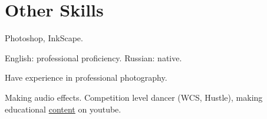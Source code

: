 \documentclass{article}
\begin{document}
 
\section{Other Skills}
\begin{description}[widest=Langauges]
\item[Software]  Photoshop, InkScape.
\item[Languages] English: professional proficiency.  Russian: native.
\item[Photography] Have experience in professional photography.
\item[Hobbies] Making audio effects. Competition level dancer (WCS, Hustle), making educational \href{https://www.youtube.com/channel/UCAjmXQnYQjWoVHx6NIo24CQ}{content} on youtube.
\end{description}
 
\end{document}
